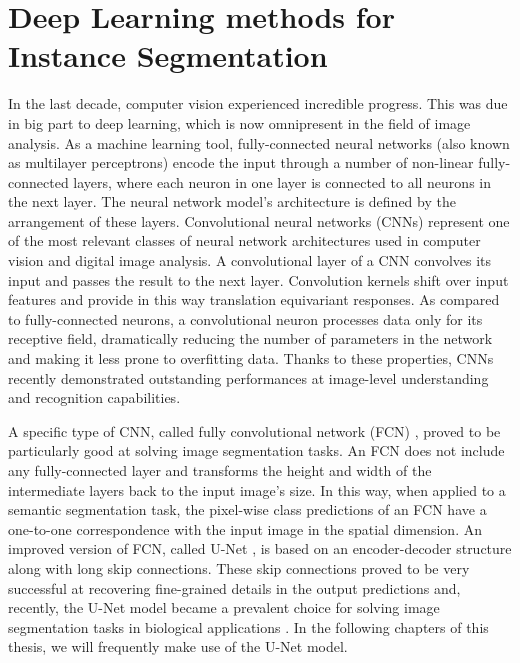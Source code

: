\section{Deep Learning methods for Instance Segmentation}
In the last decade, computer vision experienced incredible progress. This was due in big part to deep learning, which is now omnipresent in the field of image analysis. As a machine learning tool, fully-connected neural networks (also known as multilayer perceptrons) encode the input through a number of non-linear fully-connected layers, where each neuron in one layer is connected to all neurons in the next layer. The neural network model's architecture is defined by the arrangement of these layers. Convolutional neural networks (CNNs) represent one of the most relevant classes of neural network architectures used in computer vision and digital image analysis. A convolutional layer of a CNN convolves its input and passes the result to the next layer. Convolution kernels shift over input features and provide in this way translation equivariant responses. As compared to fully-connected neurons, a convolutional neuron processes data only for its receptive field,  dramatically reducing the number of parameters in the network and making it less prone to overfitting data.
Thanks to these properties, CNNs recently demonstrated outstanding performances at image-level understanding and recognition capabilities.

A specific type of CNN, called fully convolutional network (FCN) \cite{long2015fully}, proved to be particularly good at solving image segmentation tasks. An FCN does not include any fully-connected layer and transforms the height and width of the intermediate layers back to the input image's size. 
In this way, when applied to a semantic segmentation task, the pixel-wise class predictions of an FCN have a one-to-one correspondence with the input image in the spatial dimension.
An improved version of FCN, called U-Net \cite{ronneberger2015u}, is based on an encoder-decoder structure along with long skip connections. These skip connections proved to be very successful at recovering fine-grained details in the output predictions and, recently, the U-Net model became a prevalent choice for solving image segmentation tasks in biological applications \cite{lee2017superhuman,ronneberger2015u}. In the following chapters of this thesis, we will frequently make use of the U-Net model. 

